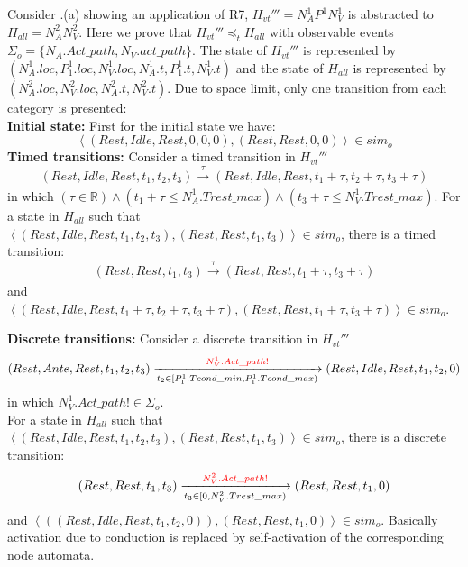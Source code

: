 Consider .(a) showing an application of R7, $H_{vt}'''=N^1_AP^1N^1_V$ is abstracted to $H_{all}=N^2_AN^2_V$. Here we prove that $H_{vt}'''\preceq_t H_{all}$ with observable events $\Sigma_o=\{N_A.Act\_path,N_V.act\_path\}$. The state of $H_{vt}'''$ is represented by $(N^1_A.loc,P^1_1.loc,N^1_V.loc,N^1_A.t,P^1_1.t,N^1_V.t)$ and the state of $H_{all}$ is represented by $(N^2_A.loc,N^2_V.loc,N^2_A.t,N^2_V.t)$. Due to space limit, only one transition from each category is presented:\\
\textbf{Initial state: }First for the initial state we have:
$$\left\langle (Rest,Idle,Rest,0,0,0),(Rest,Rest,0,0)\right\rangle\in sim_o$$ 
\textbf{Timed transitions: }Consider a timed transition in $H_{vt}'''$
$$(Rest,Idle,Rest,t_1,t_2,t_3)\xrightarrow[]{\tau}(Rest,Idle,Rest,t_1+\tau,t_2+\tau,t_3+\tau)$$
in which $(\tau\in\mathbb{R})\wedge (t_1+\tau\leq N^1_A.Trest\_max)\wedge( t_3+\tau\leq N^1_V.Trest\_max)$. For a state in $H_{all}$ such that $\left\langle (Rest,Idle,Rest,t_1,t_2,t_3),(Rest,Rest,t_1,t_3)\right\rangle\in sim_o$,  there is a timed transition:
$$(Rest,Rest,t_1,t_3)\xrightarrow[]{\tau}(Rest,Rest,t_1+\tau,t_3+\tau)$$
and $\left\langle (Rest,Idle,Rest,t_1+\tau,t_2+\tau,t_3+\tau),(Rest,Rest,t_1+\tau,t_3+\tau)\right\rangle\in sim_o$.
%

\textbf{Discrete transitions: }Consider a discrete transition in $H_{vt}'''$
$$(Rest,Ante,Rest,t_1,t_2,t_3)\xrightarrow[t_2\in [P^1_1.Tcond\_min, P^1_1.Tcond\_max) ]{\textcolor{red}{N^1_V.Act\_path!}}(Rest,Idle,Rest,t_1,t_2,0)$$
in which $N^1_V.Act\_path!\in\Sigma_o$. \\
For a state in $H_{all}$ such that $\left\langle (Rest,Idle,Rest,t_1,t_2,t_3) ,(Rest,Rest,t_1,t_3)\right\rangle\in sim_o$,  there is a discrete transition:
$$(Rest,Rest,t_1,t_3)\xrightarrow[t_3\in [0, N^2_V.Trest\_max)]{\textcolor{red}{N^2_V.Act\_path!}}(Rest,Rest,t_1,0)$$
and $\left\langle ((Rest,Idle,Rest,t_1,t_2,0)),(Rest,Rest,t_1,0)\right\rangle\in sim_o$. Basically activation due to conduction is replaced by self-activation of the corresponding node automata.

